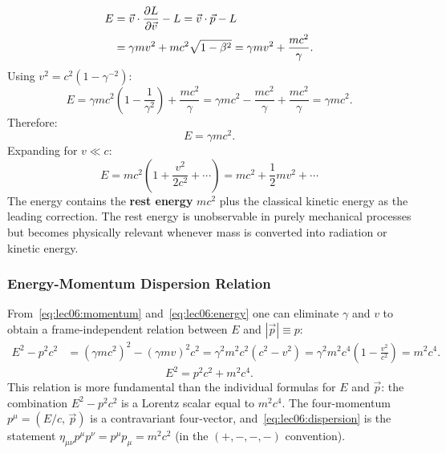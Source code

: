 \begin{align}
    E &= \vec{v}\cdot\frac{\partial L}{\partial \vec{v}} - L
       = \vec{v}\cdot\vec{p} - L \notag \\
      &= \gamma m v^2 + mc^2\sqrt{1-\beta^2}
       = \gamma m v^2 + \frac{mc^2}{\gamma} .
       \label{eq:lec06:energy-step}
\end{align}
Using $v^2 = c^2(1 - \gamma^{-2})$:
\begin{equation}\label{eq:lec06:energy-simplify}
    E = \gamma m c^2\!\left(1 - \frac{1}{\gamma^2}\right) + \frac{mc^2}{\gamma}
      = \gamma mc^2 - \frac{mc^2}{\gamma} + \frac{mc^2}{\gamma}
      = \gamma mc^2 .
\end{equation}
Therefore:
\begin{equation}\label{eq:lec06:energy}
    \boxed{E = \gamma mc^2} .
\end{equation}
Expanding for $v \ll c$:
\begin{equation}\label{eq:lec06:energy-nr}
    E = mc^2\!\left(1 + \frac{v^2}{2c^2} + \cdots\right)
      = mc^2 + \frac{1}{2}mv^2 + \cdots
\end{equation}
The energy contains the \textbf{rest energy} $mc^2$ plus the classical kinetic
energy as the leading correction.  The rest energy is unobservable in purely
mechanical processes but becomes physically relevant whenever mass is
converted into radiation or kinetic energy.

\subsubsection*{Energy-Momentum Dispersion Relation}

From~\eqref{eq:lec06:momentum} and~\eqref{eq:lec06:energy} one can eliminate
$\gamma$ and $v$ to obtain a frame-independent relation between $E$ and
$|\vec{p}| \equiv p$:
\begin{align}
    E^2 - p^2c^2
    &= (\gamma mc^2)^2 - (\gamma mv)^2c^2
     = \gamma^2 m^2c^2(c^2 - v^2)
     = \gamma^2 m^2c^4\!\left(1-\frac{v^2}{c^2}\right)
     = m^2c^4 .
     \label{eq:lec06:dispersion-derive}
\end{align}
\begin{equation}\label{eq:lec06:dispersion}
    \boxed{E^2 = p^2c^2 + m^2c^4} .
\end{equation}
This relation is more fundamental than the individual formulas for $E$ and
$\vec{p}$: the combination $E^2 - p^2c^2$ is a Lorentz scalar equal to
$m^2c^4$.  The four-momentum $p^\mu = (E/c,\,\vec{p})$ is a contravariant
four-vector, and~\eqref{eq:lec06:dispersion} is the statement
$\eta_{\mu\nu}p^\mu p^\nu = p^\mu p_\mu = m^2c^2$ (in the $(+,-,-,-)$
convention).

